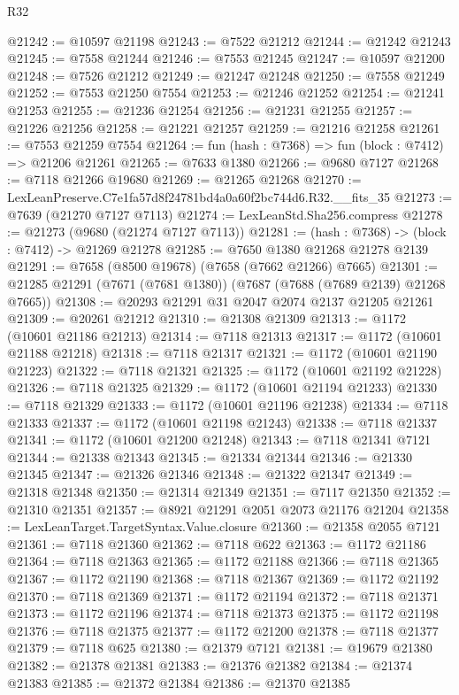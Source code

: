 \begin{lexlean}{R32}
\begin{coremodule}
@21242 := @10597 @21198
@21243 := @7522 @21212
@21244 := @21242 @21243
@21245 := @7558 @21244
@21246 := @7553 @21245
@21247 := @10597 @21200
@21248 := @7526 @21212
@21249 := @21247 @21248
@21250 := @7558 @21249
@21252 := @7553 @21250 @7554
@21253 := @21246 @21252
@21254 := @21241 @21253
@21255 := @21236 @21254
@21256 := @21231 @21255
@21257 := @21226 @21256
@21258 := @21221 @21257
@21259 := @21216 @21258
@21261 := @7553 @21259 @7554
@21264 := fun (hash : @7368) => fun (block : @7412) => @21206 @21261
@21265 := @7633 @1380
@21266 := @9680 @7127
@21268 := @7118 @21266 @19680
@21269 := @21265 @21268
@21270 := LexLeanPreserve.C7e1fa57d8f24781bd4a0a60f2bc744d6.R32.__fits_35
@21273 := @7639 (@21270 @7127 @7113)
@21274 := LexLeanStd.Sha256.compress
@21278 := @21273 (@9680 (@21274 @7127 @7113))
@21281 := (hash : @7368) -> (block : @7412) -> @21269 @21278
@21285 := @7650 @1380 @21268 @21278 @2139
@21291 := @7658 (@8500 @19678) (@7658 (@7662 @21266) @7665)
@21301 := @21285 @21291 (@7671 (@7681 @1380)) (@7687 (@7688 (@7689 @2139) @21268 @7665))
@21308 := @20293 @21291 @31 @2047 @2074 @2137 @21205 @21261
@21309 := @20261 @21212
@21310 := @21308 @21309
@21313 := @1172 (@10601 @21186 @21213)
@21314 := @7118 @21313
@21317 := @1172 (@10601 @21188 @21218)
@21318 := @7118 @21317
@21321 := @1172 (@10601 @21190 @21223)
@21322 := @7118 @21321
@21325 := @1172 (@10601 @21192 @21228)
@21326 := @7118 @21325
@21329 := @1172 (@10601 @21194 @21233)
@21330 := @7118 @21329
@21333 := @1172 (@10601 @21196 @21238)
@21334 := @7118 @21333
@21337 := @1172 (@10601 @21198 @21243)
@21338 := @7118 @21337
@21341 := @1172 (@10601 @21200 @21248)
@21343 := @7118 @21341 @7121
@21344 := @21338 @21343
@21345 := @21334 @21344
@21346 := @21330 @21345
@21347 := @21326 @21346
@21348 := @21322 @21347
@21349 := @21318 @21348
@21350 := @21314 @21349
@21351 := @7117 @21350
@21352 := @21310 @21351
@21357 := @8921 @21291 @2051 @2073 @21176 @21204
@21358 := LexLeanTarget.TargetSyntax.Value.closure
@21360 := @21358 @2055 @7121
@21361 := @7118 @21360
@21362 := @7118 @622
@21363 := @1172 @21186
@21364 := @7118 @21363
@21365 := @1172 @21188
@21366 := @7118 @21365
@21367 := @1172 @21190
@21368 := @7118 @21367
@21369 := @1172 @21192
@21370 := @7118 @21369
@21371 := @1172 @21194
@21372 := @7118 @21371
@21373 := @1172 @21196
@21374 := @7118 @21373
@21375 := @1172 @21198
@21376 := @7118 @21375
@21377 := @1172 @21200
@21378 := @7118 @21377
@21379 := @7118 @625
@21380 := @21379 @7121
@21381 := @19679 @21380
@21382 := @21378 @21381
@21383 := @21376 @21382
@21384 := @21374 @21383
@21385 := @21372 @21384
@21386 := @21370 @21385

\end{coremodule}
\end{lexlean}
